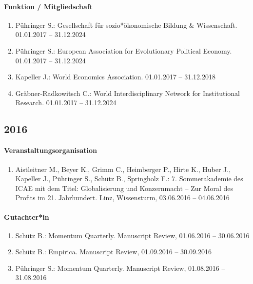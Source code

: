 \paragraph{Funktion / Mitgliedschaft}
\begin{enumerate}[leftmargin=*, labelsep=0.5cm]
\item Pühringer S.: Gesellschaft für sozio*ökonomische Bildung \& Wissenschaft. 01.01.2017 -- 31.12.2024
\item Pühringer S.: European Association for Evolutionary Political Economy. 01.01.2017 -- 31.12.2024
\item Kapeller J.: World Economics Association. 01.01.2017 -- 31.12.2018
\item Gräbner-Radkowitsch C.: World Interdisciplinary Network for Institutional Research. 01.01.2017 -- 31.12.2024
\end{enumerate}
\subsection*{2016}
\paragraph{Veranstaltungsorganisation}
\begin{enumerate}[leftmargin=*, labelsep=0.5cm]
\item Aistleitner M., Beyer K., Grimm C., Heimberger P., Hirte K., Huber J., Kapeller J., Pühringer S., Schütz B., Springholz F.: 7. Sommerakademie des ICAE mit dem Titel: Globalisierung und Konzernmacht – Zur Moral des Profits im 21. Jahrhundert. Linz, Wissensturm, 03.06.2016 -- 04.06.2016
\end{enumerate}

\paragraph{Gutachter*in}
\begin{enumerate}[leftmargin=*, labelsep=0.5cm]
\item Schütz B.: Momentum Quarterly. Manuscript Review, 01.06.2016 -- 30.06.2016
\item Schütz B.: Empirica. Manuscript Review, 01.09.2016 -- 30.09.2016
\item Pühringer S.: Momentum Quarterly. Manuscript Review, 01.08.2016 -- 31.08.2016
\end{enumerate}


